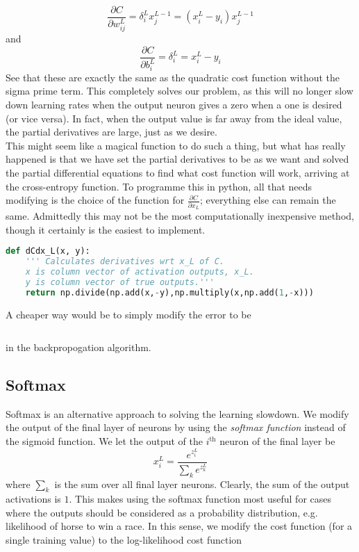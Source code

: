 \documentclass[10pt]{article}
\begin{document}
\[
\frac{\partial C}{\partial w^{L}_{ij}} = \delta^{L}_{i} x^{L-1}_j =
\left(x^{L}_i - y_i\right)x^{L-1}_j
\]
and
\[
\frac{\partial C}{\partial b^{L}_{i}} = \delta^{L}_{i} =
x^{L}_i - y_i
\]
See that these are exactly the same as the quadratic cost function without the sigma prime term. This completely solves our problem, as this will no longer slow down learning rates when the output neuron gives a zero when a one is desired (or vice versa). In fact, when the output value is far away from the ideal value, the partial derivatives are large, just as we desire.\\
This might seem like a magical function to do such a thing, but what has really happened is that we have set the partial derivatives to be as we want and solved the partial differential equations to find what cost function will work, arriving at the cross-entropy function. To programme this in python, all that needs modifying is the choice of the function for $\frac{\partial C}{\partial x_L}$; everything else can remain the same. Admittedly this may not be the most computationally inexpensive method, though it certainly is the easiest to implement.
\begin{lstlisting}[language=Python, breaklines, basicstyle=\small]
def dCdx_L(x, y):
	''' Calculates derivatives wrt x_L of C.
	x is column vector of activation outputs, x_L.
	y is column vector of true outputs.'''
	return np.divide(np.add(x,-y),np.multiply(x,np.add(1,-x)))
\end{lstlisting}
A cheaper way would be to simply modify the error to be
\begin{lstlisting}[language=Python, breaklines, delta = [x_L - y]
\end{lstlisting}
in the backpropogation algorithm.

\subsection{Softmax}
Softmax is an alternative approach to solving the learning slowdown. We modify the output of the final layer of neurons by using the \textit{softmax function} instead of the sigmoid function. We let the output of the $i^{\text{th}}$ neuron of the final layer be
\[
x^{L}_i = \frac{e^{z^L_i}}{\sum_k e^{z^L_k}}
\]
where $\sum_k$ is the sum over all final layer neurons. Clearly, the sum of the output activations is $1$. This makes using the softmax function most useful for cases where the outputs should be considered as a probability distribution, e.g. likelihood of horse to win a race. In this sense, we modify the cost function (for a single training value) to the log-likelihood cost function
\end{document}
